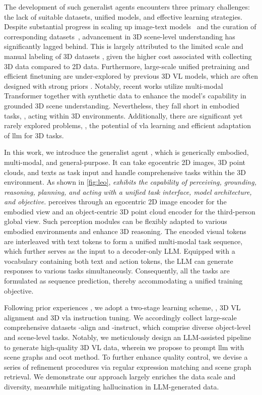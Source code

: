 \documentclass{article}
\begin{document}
The development of such generalist agents encounters three primary challenges: the lack of suitable datasets, unified models, and effective learning strategies. Despite substantial progress in scaling up image-text models~\citep{tsimpoukelli2021multimodal,alayrac2022flamingo} and the curation of corresponding datasets~\citep{radford2021learning,schuhmann2022laion}, advancement in 3D scene-level understanding has significantly lagged behind. This is largely attributed to the limited scale and manual labeling of 3D datasets \citep{dai2017scannet,wald2019rio,chen2020scanrefer}, given the higher cost associated with collecting 3D data compared to 2D data. Furthermore, large-scale unified pretraining and efficient finetuning are under-explored by previous 3D VL models, which are often designed with strong priors \citep{zhao20213dvg,chen2022language}. Notably, recent works \citep{zhu20233d,hong20233d} utilize multi-modal Transformer together with synthetic data to enhance the model's capability in grounded 3D scene understanding. Nevertheless, they fall short in embodied tasks, \eg, acting within 3D environments. Additionally, there are significant yet rarely explored problems, \eg, the potential of \ac{vla} learning and efficient adaptation of \ac{llm} for 3D tasks.


In this work, we introduce the generalist agent \agent, which is generically embodied, multi-modal, and general-purpose. It can take egocentric 2D images, 3D point clouds, and texts as task input and handle comprehensive tasks within the 3D environment. As shown in \cref{fig:leo}, \textit{\agent exhibits the capability of perceiving, grounding, reasoning, planning, and acting with a unified task interface, model architecture, and objective.} \agent perceives through an egocentric 2D image encoder for the embodied view and an object-centric 3D point cloud encoder for the third-person global view. Such perception modules can be flexibly adapted to various embodied environments and enhance 3D reasoning. The encoded visual tokens are interleaved with text tokens to form a unified multi-modal task sequence, which further serves as the input to a decoder-only LLM. Equipped with a vocabulary containing both text and action tokens, the LLM can generate responses to various tasks simultaneously. Consequently, all the tasks are formulated as sequence prediction, thereby accommodating a unified training objective.

Following prior experiences \citep{liu2023visual}, we adopt a two-stage learning scheme, \ie, 3D VL alignment and 3D \ac{vla} instruction tuning. We accordingly collect large-scale comprehensive datasets \agent-align and \agent-instruct, which comprise diverse object-level and scene-level tasks. Notably, we meticulously design an LLM-assisted pipeline to generate high-quality 3D VL data, wherein we propose to prompt \ac{llm} \citep{openai2022chatgpt} with scene graphs and \ac{ocot} method. To further enhance quality control, we devise a series of refinement procedures via regular expression matching and scene graph retrieval. We demonstrate our approach largely enriches the data scale and diversity, meanwhile mitigating hallucination in LLM-generated data.
\end{document}
